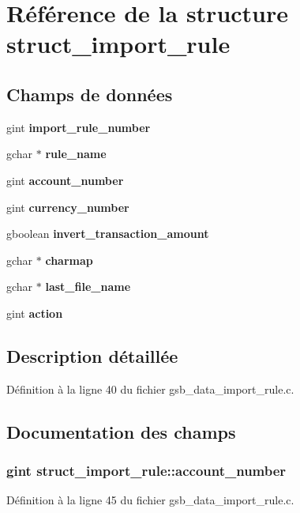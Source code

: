 \section{Référence de la structure struct\_\-import\_\-rule}
\label{structstruct__import__rule}
\subsection*{Champs de données}
\begin{DoxyCompactItemize}
\item 
gint {\bf import\_\-rule\_\-number}
\item 
gchar $\ast$ {\bf rule\_\-name}
\item 
gint {\bf account\_\-number}
\item 
gint {\bf currency\_\-number}
\item 
gboolean {\bf invert\_\-transaction\_\-amount}
\item 
gchar $\ast$ {\bf charmap}
\item 
gchar $\ast$ {\bf last\_\-file\_\-name}
\item 
gint {\bf action}
\end{DoxyCompactItemize}


\subsection{Description détaillée}


Définition à la ligne 40 du fichier gsb\_\-data\_\-import\_\-rule.c.



\subsection{Documentation des champs}
\subsubsection[{account\_\-number}]{\setlength{\rightskip}{0pt plus 5cm}gint {\bf struct\_\-import\_\-rule::account\_\-number}}\label{structstruct__import__rule_a3f73cd97b0b1c97d30c44d33bc91866a}


Définition à la ligne 45 du fichier gsb\_\-data\_\-import\_\-rule.c.

